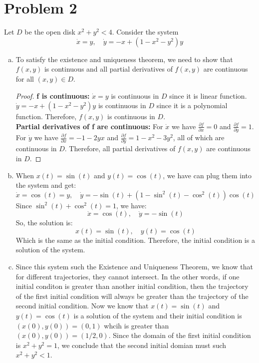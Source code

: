 \documentclass[12pt]{exam}
\begin{document}
\section*{Problem 2}
Let $D$ be the open disk $x^2+y^2<4$. Consider the system
\[ \dot{x} = y, \quad \dot{y} = -x + (1-x^2-y^2)y \]
\begin{enumerate}[(a)]
	\item To satisfy the existence and uniqueness theorem, we need to show that $f(x,y)$ is continuous and all partial derivatives of $f(x,y)$ are continuous for all $(x,y) \in D$.
	\begin{proof}
		\textbf{f is continuous:} $\dot{x} = y$ is continuous in $D$ since it is linear function. $\dot{y} = -x + (1-x^2-y^2)y$ is continuous in $D$ since it is a polynomial function. Therefore, $f(x,y)$ is continuous in $D$. \\
		\textbf{Partial derivatives of f are continuous:} For $\dot{x}$ we have $\frac{\partial f}{\partial x} = 0$ and $\frac{\partial f}{\partial y} = 1$. For $\dot{y}$ we have $\frac{\partial f}{\partial x} = -1-2yx$ and $\frac{\partial f}{\partial y} = 1-x^2-3y^2$, all of which are continuous in $D$. Therefore, all partial derivatives of $f(x,y)$ are continuous in $D$.
	\end{proof}
	
	\item When $x(t)=\sin(t)$ and $y(t)=\cos(t)$, we have can plug them into the system and get:
	\[ \dot{x} = \cos(t) = y, \quad \dot{y} = -\sin(t) + (1-\sin^2(t)-\cos^2(t))\cos(t)  \]
	Since $\sin^2(t)+\cos^2(t)=1$, we have:
	\[ \dot{x} = \cos(t), \quad \dot{y} = -\sin(t)\]
	So, the solution is:
	\[ x(t) = \sin(t), \quad y(t) = \cos(t) \]
	Which is the same as the initial condition. Therefore, the initial condition is a solution of the system.

	\item Since this system such the Existence and Uniqueness Theorem, we know that for different trajectories, they cannot intersect. In the other words, if one initial conditon is greater than another initial condition, then the trajectory of the first initial condition will always be greater than the trajectory of the second initial condition. Now we know that $x(t)=\sin(t)$ and $y(t)=\cos(t)$ is a solution of the system and their initial condition is $(x(0),y(0))=(0,1)$ whcih is greater than $(x(0),y(0))=(1/2,0)$. Since the domain of the first initial condition is $x^2+y^2=1$, we conclude that the second initial domian must such $x^2+y^2<1$.

\end{enumerate}
\end{document}
